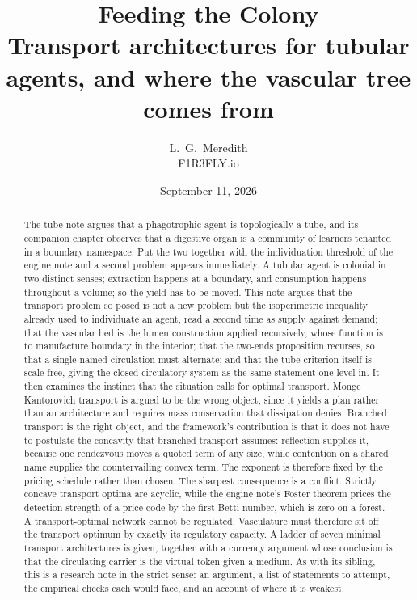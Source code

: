 \documentclass[11pt]{article}
\title{\bfseries Feeding the Colony\\[.35em]
\large Transport architectures for tubular agents, and where the vascular tree comes from}
\author{L.\ G.\ Meredith\\ \small F1R3FLY.io}
\date{September 11, 2026}
\theoremstyle{plain}
\theoremstyle{definition}
\begin{document}
\maketitle

\begin{abstract}
The tube note \cite{tubenote} argues that a phagotrophic agent is topologically a tube, and its
companion chapter observes that a digestive organ is a community of learners tenanted in a boundary
namespace. Put the two together with the individuation threshold of the engine note and a second
problem appears immediately. A tubular agent is colonial in two distinct senses; extraction happens
at a boundary, and consumption happens throughout a volume; so the yield has to be moved. This note
argues that the transport problem so posed is not a new problem but the isoperimetric inequality
already used to individuate an agent, read a second time as supply against demand; that the vascular
bed is the lumen construction applied recursively, whose function is to manufacture boundary in the
interior; that the two-ends proposition recurses, so that a single-named circulation must alternate;
and that the tube criterion itself is scale-free, giving the closed circulatory system as the same
statement one level in. It then examines the instinct that the situation calls for optimal transport.
Monge--Kantorovich transport is argued to be the wrong object, since it yields a plan rather than an
architecture and requires mass conservation that dissipation denies. Branched transport is the right
object, and the framework's contribution is that it does not have to postulate the concavity that
branched transport assumes: reflection supplies it, because one rendezvous moves a quoted term of any
size, while contention on a shared name supplies the countervailing convex term. The exponent is
therefore fixed by the pricing schedule rather than chosen. The sharpest consequence is a conflict.
Strictly concave transport optima are acyclic, while the engine note's Foster theorem prices the
detection strength of a price code by the first Betti number, which is zero on a forest. A
transport-optimal network cannot be regulated. Vasculature must therefore sit off the transport
optimum by exactly its regulatory capacity. A ladder of seven minimal transport architectures is
given, together with a currency argument whose conclusion is that the circulating carrier is the
virtual token given a medium. As with its sibling, this is a research note in the strict sense: an
argument, a list of statements to attempt, the empirical checks each would face, and an account of
where it is weakest.
\end{abstract}
\end{document}
